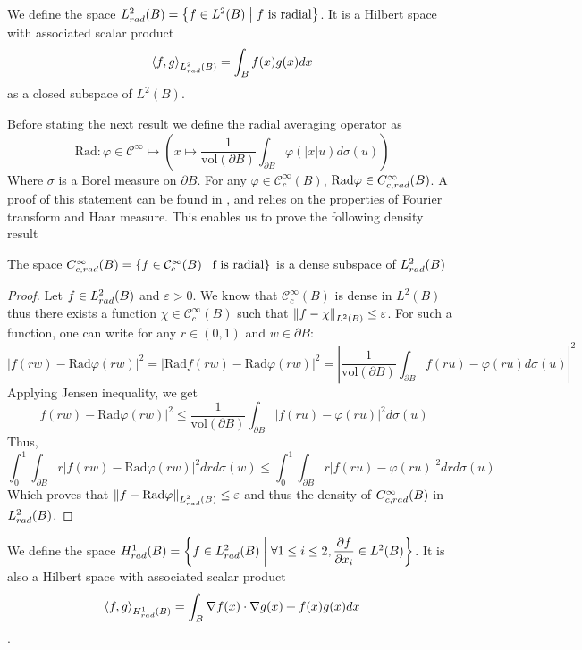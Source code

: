 \documentclass[11pt,a4paper]{article}
\begin{document}
\begin{Def} We define the space $L^2_{rad}(B) = \left\{f \in L^2(B)\mathrel{}\middle|\mathrel{} f \text{ is radial}\right\}$. It is a Hilbert space with associated scalar product \[\left\langle f,g\right\rangle_{L^2_{rad}(B)} = \int_{B}f(x)g(x)dx\]
as a closed subspace of $L^2(B)$.
\end{Def}
Before stating the next result we define the radial averaging operator as \[\text{Rad} : \varphi\in \mathcal{C}^{\infty} \mapsto \left(x\mapsto\displaystyle \frac{1}{\text{vol}\left(\partial B\right)}\int_{\partial B}\varphi(|x|u)d\sigma(u) \right)\]
Where $\sigma$ is a Borel measure on $\partial B$. For any $\varphi \in \mathcal{C}_c^{\infty}(B)$, $\text{Rad}\varphi \in C^\infty_{c,rad}(B)$. A proof of this statement can be found in \cite{SphericalAverage}, and relies on the properties of Fourier transform and Haar measure.
This enables us to prove the following density result
\begin{Prop} The space $C^\infty_{c,rad}(B) = \left\{f \in \mathcal{C}_c^\infty(B)\mathrel{}\middle|\mathrel{}\text{f is radial}\right\}$ is a dense subspace of $L^2_{rad}(B)$

\end{Prop}
\begin{proof}
Let $f \in L^2_{rad}(B)$ and $\varepsilon >0$. We know that $\mathcal{C}_c^\infty(B)$ is dense in $L^2(B)$ thus there exists a function $\chi \in \mathcal{C}_c^\infty(B)$ such that $\left\|f - \chi\right\|_{L^2(B)} \leq \varepsilon$. For such a function, one can write for any $r \in (0,1)$ and $w \in \partial B : $\[\left|f(rw) - \text{Rad}\varphi(rw)\right|^2 = \left|\text{Rad} f(rw) - \text{Rad}\varphi(rw)\right|^2 = \left|\frac{1}{\text{vol}\left(\partial B\right)} \int_{\partial B}f(ru) - \varphi(ru)d\sigma(u) \right|^2 \]
Applying Jensen inequality, we get \[\left|f(rw) - \text{Rad}\varphi(rw)\right|^2 \leq \frac{1}{\text{vol}\left(\partial B\right)} \int_{\partial B}\left|f(ru) - \varphi(ru) \right|^2 d\sigma(u)\]
Thus, \[ \int_{0}^1 \int_{\partial B} r \left| f(rw) - \text{Rad}\varphi(rw)\right|^2 dr d\sigma(w) \leq \int_{0}^1 \int_{\partial B} r\left| f(ru) - \varphi(ru)\right|^2 dr d\sigma(u)\]
Which proves that $\left\|f - \text{Rad}\varphi\right\|_{L^2_{rad}(B)} \leq \varepsilon$ and thus the density of $C^\infty_{c,rad}(B)$ in $L^2_{rad}(B)$.  
\end{proof}
\begin{Def} We define the space $H^1_{rad}(B) = \left\{f \in L^2_{rad}(B)\mathrel{}\middle|\mathrel{}\forall 1 \leq i \leq 2, \dfrac{\partial f}{\partial x_i}\in L^2(B)\right\}$. It is also a Hilbert space with associated scalar product \[\left\langle f,g\right\rangle_{H^1_{rad}(B)} = \int_{B} \nabla f(x) \cdot \nabla g(x) + f(x)g(x)dx\]. 
\end{Def}
\end{document}
